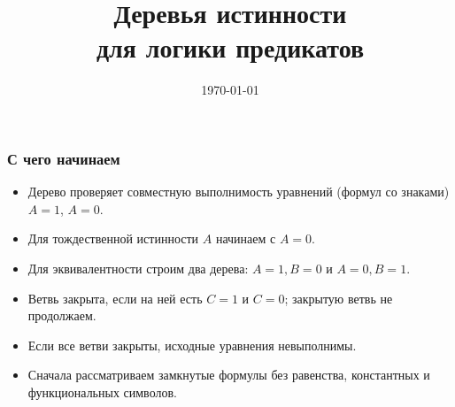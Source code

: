 \documentclass[10pt]{beamer}
\title{Деревья истинности\\для логики предикатов}
\date{\today}
\begin{document}
\begin{frame}[plain]
    \maketitle
\end{frame}

\begin{frame}
\frametitle{С чего начинаем}
\begin{itemize}
    \item Дерево проверяет совместную выполнимость уравнений (формул со знаками) $A=1$, $A=0$.
    \item Для тождественной истинности $A$ начинаем с $A=0$.
    \item Для эквивалентности строим два дерева: $A=1,B=0$ и $A=0,B=1$.
    \pause
    \item Ветвь закрыта, если на ней есть $C=1$ и $C=0$; закрытую ветвь не продолжаем.
    \item Если все ветви закрыты, исходные уравнения невыполнимы.
    \item Сначала рассматриваем замкнутые формулы без равенства, константных и функциональных символов.
\end{itemize}
\end{frame}
\end{document}
